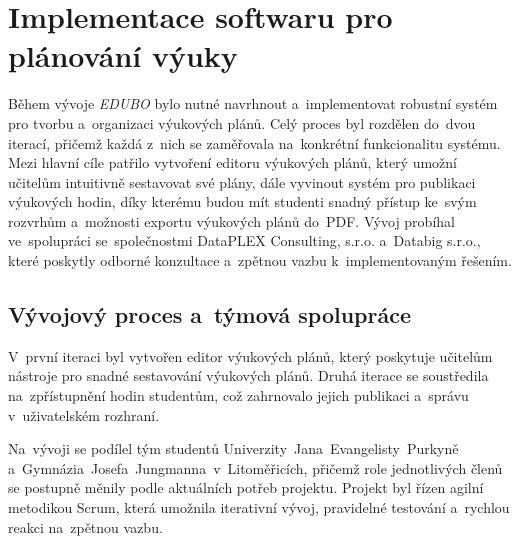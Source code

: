 \documentclass[male,czech,api_bc]{kitheses}
\begin{document}
\section{Implementace softwaru pro plánování výuky}

Během vývoje \textit{EDUBO} bylo nutné navrhnout a~implementovat robustní systém pro tvorbu a~organizaci výukových plánů. Celý proces byl rozdělen do~dvou iterací, přičemž každá z~nich se zaměřovala na~konkrétní funkcionalitu systému. Mezi hlavní cíle patřilo vytvoření editoru výukových plánů, který umožní učitelům intuitivně sestavovat své plány, dále vyvinout systém pro publikaci výukových hodin, díky kterému budou mít studenti snadný přístup ke~svým rozvrhům a~možnosti exportu výukových plánů do~PDF. Vývoj probíhal ve~spolupráci se~společnostmi DataPLEX Consulting, s.r.o. a~Databig s.r.o., které poskytly odborné konzultace a~zpětnou vazbu k~implementovaným řešením.

\subsection{Vývojový proces a~týmová spolupráce}

V~první iteraci byl vytvořen editor výukových plánů, který poskytuje učitelům nástroje pro snadné sestavování výukových plánů. Druhá iterace se soustředila na~zpřístupnění hodin studentům, což zahrnovalo jejich publikaci a~správu v~uživatelském rozhraní.

Na~vývoji se podílel tým studentů Univerzity~Jana~Evangelisty~Purkyně a~Gymnázia~Josefa~Jungmanna~v~Litoměřicích, přičemž role jednotlivých členů se postupně měnily podle aktuálních potřeb projektu. Projekt byl řízen agilní metodikou Scrum, která umožnila iterativní vývoj, pravidelné testování a~rychlou reakci na~zpětnou vazbu.
\end{document}
